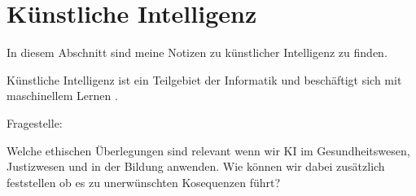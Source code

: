 \section{Künstliche Intelligenz}
\label{sec:ai}

In diesem Abschnitt sind meine Notizen zu künstlicher Intelligenz zu finden.

Künstliche Intelligenz ist ein Teilgebiet der Informatik und beschäftigt sich mit maschinellem Lernen \citep{ai-wikipedia}.

Fragestelle:

Welche ethischen Überlegungen sind relevant wenn wir KI im Gesundheitswesen, Justizwesen und in der Bildung anwenden. 
Wie können wir dabei zusätzlich feststellen ob es zu unerwünschten Kosequenzen führt?